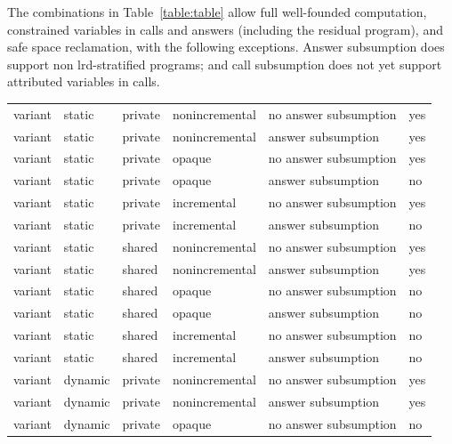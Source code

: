 The combinations in Table~\ref{table:table} allow full well-founded
computation, constrained variables in calls and answers (including the
residual program), and safe space reclamation, with the following
exceptions.  Answer subsumption does support non lrd-stratified
programs; and call subsumption does not yet support attributed
variables in calls.  

\begin{table}
\begin{center}
{\footnotesize
\begin{tabular}{llllll}\hline \hline
variant &	    static & 	   private &	  nonincremental &      no answer subsumption  &  yes \\
variant &	    static &	   private &	  nonincremental &      answer subsumption     &  yes \\
variant	&	    static &	   private &      opaque &             no answer subsumption  &  yes \\
variant &	    static &	   private &	  opaque &	      answer subsumption &	no \\
variant &	    static &	   private &	  incremental &         no answer subsumption &	yes \\
variant &	    static &	   private &      incremental &         answer subsumption &	no \\
variant &	    static &	   shared &	  nonincremental &      no answer subsumption &	yes \\
variant &	    static &	   shared &	  nonincremental &      answer subsumption &	yes \\
variant &	    static &	   shared &	  opaque &	      no answer subsumption &	no \\
variant &	    static &	   shared &	  opaque &	      answer subsumption &	no \\
variant &	    static &	   shared &	  incremental &       no answer subsumption &	no \\
variant &	    static &	   shared &	  incremental &          answer subsumption &	no \\
variant &	    dynamic &	   private &	  nonincremental &      no answer subsumption &	yes \\
variant &	    dynamic &	   private &	  nonincremental &      answer subsumption &	yes \\
variant &	    dynamic &	   private &	  opaque &	      no answer subsumption &	no \\

\end{tabular}}
\end{center}
\end{table}
